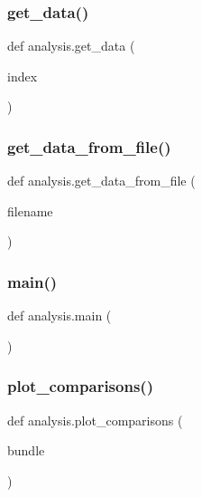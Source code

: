 \subsubsection{\texorpdfstring{get\+\_\+data()}{get\_data()}}
{\footnotesize\ttfamily def analysis.\+get\+\_\+data (\begin{DoxyParamCaption}\item[{}]{index }\end{DoxyParamCaption})}

\mbox{\label{namespaceanalysis_a5ed46a991cd908a0002b3eba77e3c60f_a5ed46a991cd908a0002b3eba77e3c60f}} 
\subsubsection{\texorpdfstring{get\+\_\+data\+\_\+from\+\_\+file()}{get\_data\_from\_file()}}
{\footnotesize\ttfamily def analysis.\+get\+\_\+data\+\_\+from\+\_\+file (\begin{DoxyParamCaption}\item[{}]{filename }\end{DoxyParamCaption})}

\mbox{\label{namespaceanalysis_a934813823c988db63ba98f300055b998_a934813823c988db63ba98f300055b998}} 
\subsubsection{\texorpdfstring{main()}{main()}}
{\footnotesize\ttfamily def analysis.\+main (\begin{DoxyParamCaption}{ }\end{DoxyParamCaption})}

\mbox{\label{namespaceanalysis_a4986d1dad621042c37f83c42ccbd7f57_a4986d1dad621042c37f83c42ccbd7f57}} 
\subsubsection{\texorpdfstring{plot\+\_\+comparisons()}{plot\_comparisons()}}
{\footnotesize\ttfamily def analysis.\+plot\+\_\+comparisons (\begin{DoxyParamCaption}\item[{}]{bundle }\end{DoxyParamCaption})}


